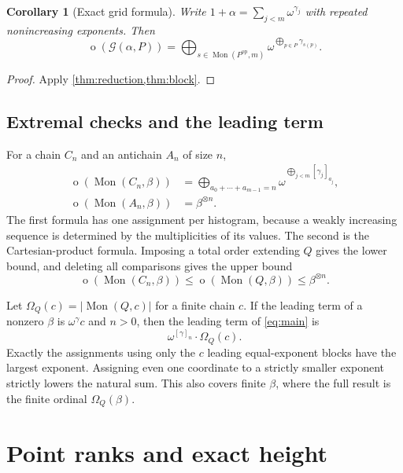 \documentclass[11pt,a4paper]{article}
\newtheorem{corollary}[corollary]{Corollary}
\theoremstyle{definition}
\theoremstyle{remark}
\newcommand{\Mon}{\operatorname{Mon}}
\newcommand{\Grid}{\mathcal{G}}
\newcommand{\otype}{\operatorname{o}}
\newcommand{\op}{\mathrm{op}}
\newcommand{\Nrep}[2]{\left[#1\right]_{#2}}
\begin{document}
\begin{corollary}[Exact grid formula]\label{cor:gridformula}
Write $1+\alpha=\sum_{j<m}\omega^{\gamma_j}$ with repeated nonincreasing
exponents. Then
\begin{equation}\label{eq:gridformula}
 \otype(\Grid(\alpha,P))
 =\bigoplus_{s\in\Mon(P^{\op},m)}
       \omega^{\bigoplus_{p\in P}\gamma_{s(p)}}.
\end{equation}
\end{corollary}
\begin{proof}
Apply \cref{thm:reduction,thm:block}.
\end{proof}

\subsection{Extremal checks and the leading term}
For a chain $C_n$ and an antichain $A_n$ of size $n$,
\begin{align}
 \otype(\Mon(C_n,\beta))
 &=\bigoplus_{a_0+\cdots+a_{m-1}=n}
      \omega^{\bigoplus_{j<m}\Nrep{\gamma_j}{a_j}},\label{eq:chain}\\
 \otype(\Mon(A_n,\beta))&=\beta^{\otimes n}.\label{eq:anti}
\end{align}
The first formula has one assignment per histogram, because a weakly
increasing sequence is determined by the multiplicities of its values.
The second is the Cartesian-product formula. Imposing a total order
extending $Q$ gives the lower bound, and deleting all comparisons gives
the upper bound
\begin{equation}\label{eq:bounds}
 \otype(\Mon(C_n,\beta))
 \leq\otype(\Mon(Q,\beta))\leq\beta^{\otimes n}.
\end{equation}

Let $\Omega_Q(c)=|\Mon(Q,c)|$ for a finite chain $c$. If the leading term
of a nonzero $\beta$ is $\omega^\gamma c$ and $n>0$, then the leading term
of \eqref{eq:main} is
\begin{equation}\label{eq:leading}
 \omega^{\Nrep{\gamma}{n}}\cdot\Omega_Q(c).
\end{equation}
Exactly the assignments using only the $c$ leading equal-exponent blocks
have the largest exponent. Assigning even one coordinate to a strictly
smaller exponent strictly lowers the natural sum. This also covers finite
$\beta$, where the full result is the finite ordinal $\Omega_Q(\beta)$.

\section{Point ranks and exact height}
\end{document}
